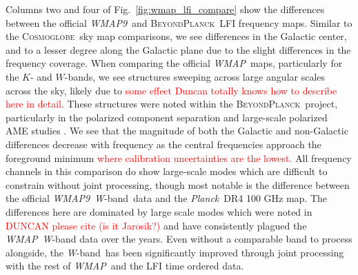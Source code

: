 \documentclass[twocolumn]{../../common/aa}
\def\WMAP{\emph{WMAP}}
\def\WMAPnine{\emph{WMAP9}}
\def\Planck{\emph{Planck}}
\newcommand{\BP}{\textsc{BeyondPlanck}}
\newcommand{\cosmoglobe}{\textsc{Cosmoglobe}}
\newcommand{\W}[0]{\textit W}
\begin{document}
Columns two and four of Fig.~\ref{fig:wmap_lfi_compare} show the differences between the official \WMAPnine\ and \BP\ LFI frequency maps. Similar to the \cosmoglobe\ sky map comparisons, we see differences in the Galactic center, and to a lesser degree along the Galactic plane due to the slight differences in the frequency coverage. When comparing the official \WMAP\ maps, particularly for the $K$- and $W$-bands, we see structures sweeping across large angular scales across the sky, likely due to \textcolor{red}{some effect Duncan totally knows how to describe here in detail}. These structures were noted within the \BP\ project, particularly in the polarized component separation and large-scale polarized AME studies \citep{bp14,bp15}. We see that the magnitude of both the Galactic and non-Galactic differences decrease with frequency as the central frequencies approach the foreground minimum \textcolor{red}{where calibration uncertainties are the lowest.} All frequency channels in this comparison do show large-scale modes which are difficult to constrain without joint processing, though most notable is the difference between the official \WMAPnine\ \W-band\ data and the \Planck\ DR4 100 GHz map. The differences here are dominated by large scale modes which were noted in \textcolor{red}{DUNCAN please cite (is it Jarosik?)} and have consistently plagued the \WMAP\ \W-band data over the years. Even without a comparable band to process alongside, the \W-band\ has been significantly improved through joint processing with the rest of \WMAP\ and the LFI time ordered data.
\end{document}
